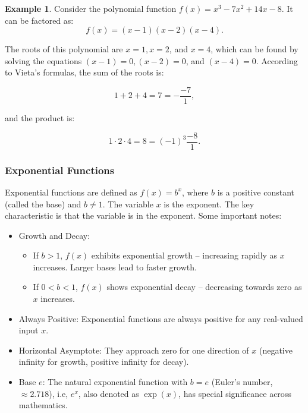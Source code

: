 \documentclass[12pt]{article}
\theoremstyle{definition}
\newtheorem*{example}{Example}
\begin{document}
\begin{example}
Consider the polynomial function $f(x) = x^3 - 7x^2 + 14x - 8$. It can be factored as:
\[
f(x) = (x - 1)(x - 2)(x - 4).
\]
\end{example}

The roots of this polynomial are $x = 1, x = 2$, and $x = 4$, which can be found by solving the equations $(x - 1) = 0, (x - 2) = 0$, and $(x - 4) = 0$. According to Vieta's formulas, the sum of the roots is:

\[
1 + 2 + 4 = 7 = -\frac{-7}{1},
\]

and the product is:

\[
1 \cdot 2 \cdot 4 = 8 = (-1)^3 \frac{-8}{1}.
\]

\subsubsection*{Exponential Functions}

Exponential functions are defined as $f(x) = b^x$, where $b$ is a positive constant (called the base) and $b \neq 1$. The variable $x$ is the exponent. The key characteristic is that the variable is in the exponent. Some important notes:

\begin{itemize}
    \item Growth and Decay:
    \begin{itemize}
        \item If $b > 1$, $f(x)$ exhibits exponential growth -- increasing rapidly as $x$ increases. Larger bases lead to faster growth.
        
        \item If $0 < b < 1$, $f(x)$ shows exponential decay -- decreasing towards zero as $x$ increases.
    \end{itemize}
    
    \item Always Positive: Exponential functions are always positive for any real-valued input $x$.
    
    \item Horizontal Asymptote: They approach zero for one direction of $x$ (negative infinity for growth, positive infinity for decay).
    
    \item Base $e$: The natural exponential function with $b = e$ (Euler's number, $\approx 2.718$), i.e, $e^x$, also denoted as $\exp(x)$, has special significance across mathematics.
\end{itemize}
\end{document}
